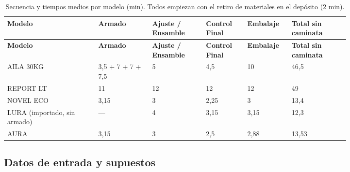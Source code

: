\documentclass[11pt,a4paper]{article}
\begin{document}
{\small
\begin{longtable}{P{0.221\linewidth}P{0.134\linewidth}P{0.134\linewidth}P{0.103\linewidth}P{0.087\linewidth}P{0.142\linewidth}}
\caption{Secuencia y tiempos medios por modelo (min). Todos empiezan con el retiro de materiales en el depósito (2 min).}\\
\textbf{Modelo} & \textbf{Armado} & \textbf{Ajuste / Ensamble} & \textbf{Control Final} & \textbf{Embalaje} & \textbf{Total sin caminata} \\
\endfirsthead
{}\textbf{Modelo} & \textbf{Armado} & \textbf{Ajuste / Ensamble} & \textbf{Control Final} & \textbf{Embalaje} & \textbf{Total sin caminata} \\
\endhead
AILA 30KG & 3,5 + 7 + 7 + 7,5 & 5 & 4,5 & 10 & 46,5 \\
REPORT LT & 11 & 12 & 12 & 12 & 49 \\
NOVEL ECO & 3,15 & 3 & 2,25 & 3 & 13,4 \\
LURA (importado, sin armado) & — & 4 & 3,15 & 3,15 & 12,3 \\
AURA & 3,15 & 3 & 2,5 & 2,88 & 13,53 \\
\end{longtable}
}

\subsection{Datos de entrada y supuestos}
\end{document}
